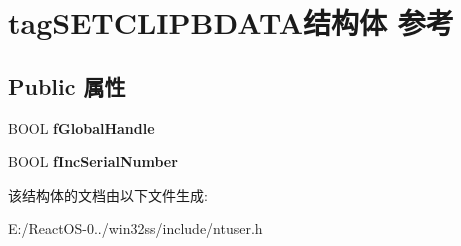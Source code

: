 \hypertarget{structtag_s_e_t_c_l_i_p_b_d_a_t_a}{}\section{tag\+S\+E\+T\+C\+L\+I\+P\+B\+D\+A\+T\+A结构体 参考}
\label{structtag_s_e_t_c_l_i_p_b_d_a_t_a}
\subsection*{Public 属性}
\begin{DoxyCompactItemize}
\item 
\mbox{\label{structtag_s_e_t_c_l_i_p_b_d_a_t_a_ad1dad46c07b7ec9d02536008486582f2}} 
B\+O\+OL {\bfseries f\+Global\+Handle}
\item 
\mbox{\label{structtag_s_e_t_c_l_i_p_b_d_a_t_a_a997c598ff90e1051d4b711e1da128b96}} 
B\+O\+OL {\bfseries f\+Inc\+Serial\+Number}
\end{DoxyCompactItemize}


该结构体的文档由以下文件生成\+:\begin{DoxyCompactItemize}
\item 
E\+:/\+React\+O\+S-\/0../win32ss/include/ntuser.\+h\end{DoxyCompactItemize}
